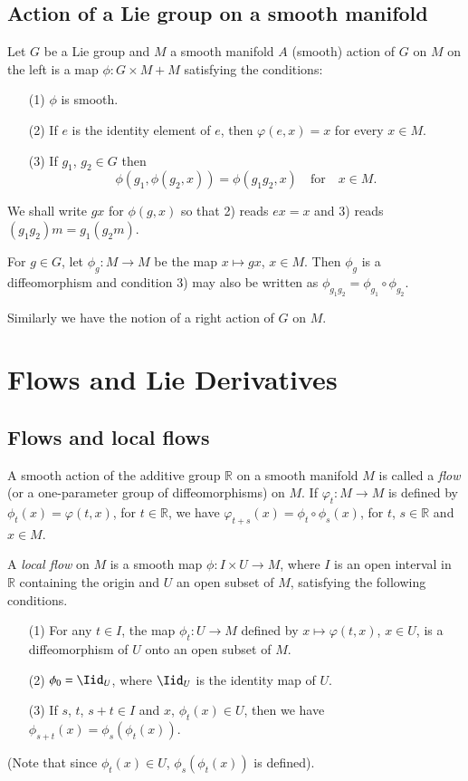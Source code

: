 \subsection*{Action of a Lie group on a smooth manifold}

Let $G$ be a Lie group and $M$ a smooth manifold $A$ (smooth) action of $G$ on $M$ on the left is a map $\phi:G\times M+M$ satisfying the conditions:
\begin{itemize}
\item[(1)] $\phi$ is smooth.

\item[(2)] If $e$ is the identity element of $e$, then $\varphi(e,x)=x$ for every $x\in M$.

\item[(3)] If $g_{1}$, $g_{2}\in G$ then
$$
\phi(g_{1},\phi(g_{2},x))=\phi(g_{1}g_{2},x)\quad\text{for}\quad x\in M.
$$
\end{itemize}

We shall write $gx$ for $\phi(g,x)$ so that 2) reads $ex=x$ and 3) reads $(g_{1}g_{2})m=g_{1}(g_{2}m)$.

For $g\in G$, let $\phi_{g}:M\to M$ be the map $x\mapsto gx$, $x\in M$. Then $\phi_{g}$ is a diffeomorphism and condition 3) may also be written as $\phi_{g_{1}g_{2}}=\phi_{g_{1}}\circ \phi_{g_{2}}$.

Similarly we have the notion of a right action of $G$ on $M$.

\section{Flows and Lie Derivatives}\label{sec6}

\subsection*{Flows and local flows}
\pageoriginale

A smooth action of the additive group $\mathbb{R}$ on a smooth manifold $M$ is called a {\em flow} (or a one-parameter group of diffeomorphisms) on $M$. If $\varphi_{t}:M\to M$ is defined by $\phi_{t}(x)=\varphi(t,x)$, for $t\in \mathbb{R}$, we have $\varphi_{t+s}(x)=\phi_{t}\circ \phi_{s}(x)$, for $t$, $s\in \mathbb{R}$ and $x\in M$.

A {\em local flow} on $M$ is a smooth map $\phi:I\times U\to M$, where $I$ is an open interval in $\mathbb{R}$ containing the origin and $U$ an open subset of $M$, satisfying the following conditions.
\begin{itemize}
\item[(1)] For any $t\in I$, the map $\phi_{t}:U\to M$ defined by $x\mapsto \varphi(t,x)$, $x\in U$, is a diffeomorphism of $U$ onto an open subset of $M$.

\item[(2)] $\phi_{0}=\Iid_{U}$, where $\Iid_{U}$ is the identity map of $U$.

\item[(3)] If $s$, $t$, $s+t\in I$ and $x$, $\phi_{t}(x)\in U$, then we have $\phi_{s+t}(x)=\phi_{s}(\phi_{t}(x))$.
\end{itemize}
(Note that since $\phi_{t}(x)\in U$, $\phi_{s}(\phi_{t}(x))$ is defined).

